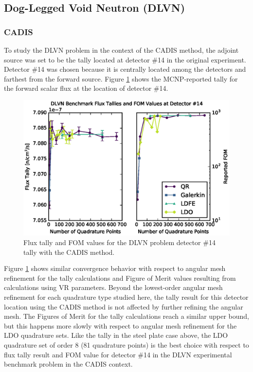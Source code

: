 \documentclass{article} %
\begin{document}
\subsection{Dog-Legged Void Neutron (DLVN)}

\subsubsection{CADIS}

To study the DLVN problem in the context of the CADIS method, the adjoint
source was set to be the tally located at detector \#14 in the original
experiment. Detector \#14 was chosen because it is centrally located among the
detectors and farthest from the forward source. Figure \ref{dlvn-cadis}
shows the MCNP-reported tally for the forward scalar flux at the location of
detector \#14.

\begin{figure}[!htb]
\centering
\includegraphics[max height=0.445\textheight]{dlvn-cadis.eps}
\caption{Flux tally and FOM values for the DLVN problem detector \#14 tally
         with the CADIS method.}
\label{dlvn-cadis}
\end{figure}

Figure \ref{dlvn-cadis} shows similar convergence
behavior with respect to angular mesh refinement for the tally calculations
and Figure of Merit values resulting from calculations using VR parameters.
Beyond the lowest-order angular mesh refinement for each quadrature type
studied here, the tally result for this detector location using the CADIS
method is not affected by further refining the angular mesh. The Figures of
Merit for the tally calculations reach a similar upper bound, but this happens
more slowly with respect to angular mesh refinement for the LDO quadrature
sets. Like the tally in the steel plate case above, the LDO quadrature set of
order 8 (81 quadrature points) is the best choice with respect to flux tally
result and FOM value for detector \#14 in the DLVN experimental benchmark
problem in the CADIS context.
\end{document}
